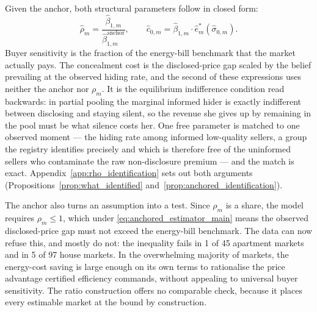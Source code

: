 Given the anchor, both structural parameters follow in closed form:
\begin{equation}
    \hat\rho_m = \frac{\hat\beta_{1,m}}{\hat\beta_{1,m}^{\mathrm{anchor}}}, \qquad
    \hat c_{0,m} = \hat\beta_{1,m}\cdot\hat e^*_m(\hat\sigma_{0,m}).
    \label{eq:anchored_estimator_main}
\end{equation}
Buyer sensitivity is the fraction of the energy-bill benchmark that the market actually pays. The concealment cost is the disclosed-price gap scaled by the belief prevailing at the observed hiding rate, and the second of these expressions uses neither the anchor nor $\rho_m$. It is the equilibrium indifference condition read backwards: in partial pooling the marginal informed hider is exactly indifferent between disclosing and staying silent, so the revenue she gives up by remaining in the pool must be what silence costs her. One free parameter is matched to one observed moment --- the hiding rate among informed low-quality sellers, a group the registry identifies precisely and which is therefore free of the uninformed sellers who contaminate the raw non-disclosure premium --- and the match is exact. Appendix~\ref{app:rho_identification} sets out both arguments (Propositions~\ref{prop:what_identified} and~\ref{prop:anchored_identification}).

The anchor also turns an assumption into a test. Since $\rho_m$ is a share, the model requires $\rho_m\leq1$, which under \eqref{eq:anchored_estimator_main} means the observed disclosed-price gap must not exceed the energy-bill benchmark. The data can now refuse this, and mostly do not: the inequality fails in 1 of 45 apartment markets and in 5 of 97 house markets. In the overwhelming majority of markets, the energy-cost saving is large enough on its own terms to rationalise the price advantage certified efficiency commands, without appealing to universal buyer sensitivity. The ratio construction offers no comparable check, because it places every estimable market at the bound by construction.

